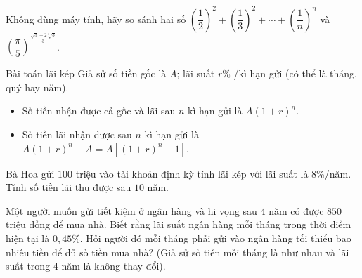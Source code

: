 \begin{bt}%
	Không dùng máy tính, hãy so sánh hai số $\left( \dfrac{1}{2}\right)^2+\left(\dfrac{1}{3}\right)^2+\cdots +\left(\dfrac{1}{n}\right)^n$ và $\left(\dfrac{\pi}{5}\right)^{\frac{\sqrt{5}-2\sqrt[3]{5}}{3}}$.
\end{bt}
\begin{dang}{Bài toán lãi kép}
Giả sử số tiền gốc là $A$; lãi suất $r\%$ /kì hạn gửi (có thể là tháng, quý hay năm).
\begin{itemize}
	\item Số tiền nhận được cả gốc và lãi sau $n$ kì hạn gửi là $A\left(1+r\right)^n$.
	\item Số tiền lãi nhận được sau $n$ kì hạn gửi là $A\left(1+r\right)^n-A=A\left[\left(1+r\right)^n-1\right]$.
\end{itemize} 
\end{dang}
\begin{vd}%
	Bà Hoa gửi $100$ triệu vào tài khoản định kỳ tính lãi kép với lãi suất là 8\%/năm. Tính số tiền lãi thu được sau $10$ năm.
	\end{vd}
\begin{vd}%
	Một người muốn gửi tiết kiệm ở ngân hàng và hi vọng sau $4$ năm có được $850$ triệu đồng để mua nhà. Biết rằng lãi suất ngân hàng mỗi tháng trong thời điểm hiện tại là $0,45\%$. Hỏi người đó mỗi tháng phải gửi vào ngân hàng tối thiểu bao nhiêu tiền để đủ số tiền mua nhà? (Giả sử số tiền mỗi tháng là như nhau và lãi suất trong $4$ năm là không thay đổi).
\end{vd}
